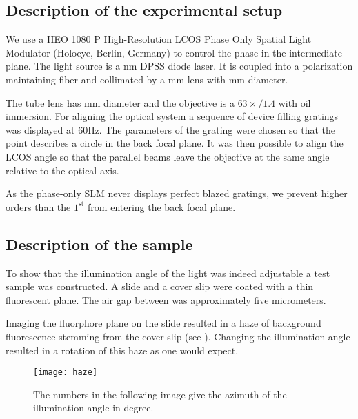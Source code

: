 \subsection{Description of the experimental setup}
We use a HEO 1080 P High-Resolution LCOS Phase Only Spatial Light
Modulator (Holoeye, Berlin, Germany) to control the phase in the
intermediate plane. The light source is a \unit[473]{nm} DPSS diode
laser. It is coupled into a polarization maintaining fiber and
collimated by a \unit[150]{mm} lens with \unit[50]{mm} diameter.

The tube lens has \unit[300]{mm} diameter and the objective is a
$63\times/1.4$ with oil immersion.  For aligning the optical system a
sequence of device filling gratings was displayed at 60Hz. The
parameters of the grating were chosen so that the point describes a
circle in the back focal plane. It was then possible to align the LCOS
angle so that the parallel beams leave the objective at the same angle
relative to the optical axis.

As the phase-only SLM never displays perfect blazed gratings, we
prevent higher orders than the $1^\textrm{st}$ from entering the back
focal plane.

\subsection{Description of the sample}
To show that the illumination angle of the light was indeed adjustable
a test sample was constructed. A slide and a cover slip were coated
with a thin fluorescent plane. The air gap between was approximately
five micrometers.

Imaging the fluorphore plane on the slide resulted in a haze of
background fluorescence stemming from the cover slip (see
). Changing the illumination angle resulted in a
rotation of this haze as one would expect.
\begin{figure}
  \centering
  \texttt{[image: haze]}
  \caption{The numbers in the following image give the azimuth of the
    illumination angle in degree.}
  \label{fig:holo-meas}
\end{figure}

